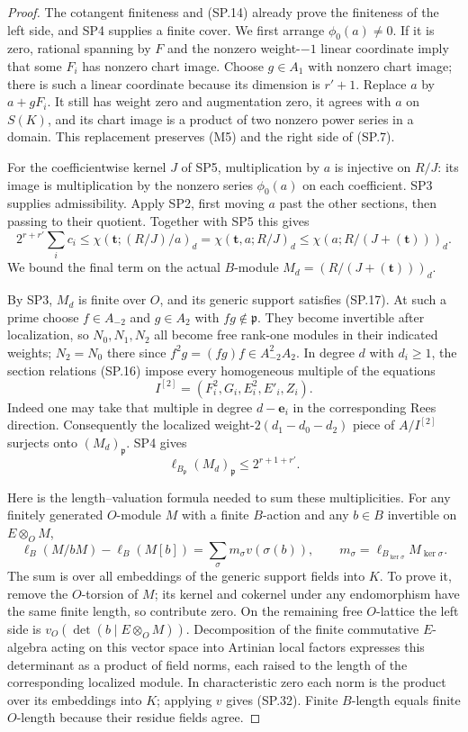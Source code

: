\begin{proof}
The cotangent finiteness and (SP.14) already prove the finiteness of
the left side, and SP4 supplies a finite cover.  We first arrange
$\phi_0(a)\ne0$.  If it is zero, rational spanning by $F$ and the
nonzero weight-$-1$ linear coordinate imply that some $F_i$ has
nonzero chart image.  Choose $g\in A_1$ with nonzero chart image;
there is such a linear coordinate because its dimension is $r'+1$.
Replace $a$ by $a+gF_i$.  It still has weight zero and augmentation
zero, it agrees with $a$ on $S(K)$, and its chart image is a product
of two nonzero power series in a domain.  This replacement preserves
(M5) and the right side of (SP.7).

For the coefficientwise kernel $J$ of SP5, multiplication by $a$
is injective on $R/J$: its image is multiplication by the nonzero
series $\phi_0(a)$ on each coefficient.  SP3 supplies admissibility.
Apply SP2, first moving $a$ past the other sections, then passing to
their quotient.  Together with SP5 this gives
\[
 2^{r+r'}\sum_i c_i
 \le \chi(\mathbf t;(R/J)/a)_d
 =\chi(\mathbf t,a;R/J)_d
 \le\chi(a;R/(J+(\mathbf t)))_d .
 \tag{SP.30}
\]
We bound the final term on the actual $B$-module
$M_d=(R/(J+(\mathbf t)))_d$.

By SP3, $M_d$ is finite over $O$, and its generic support satisfies
(SP.17).  At such a prime choose $f\in A_{-2}$ and $g\in A_2$
with $fg\notin\mathfrak p$.  They become invertible after
localization, so $N_0,N_1,N_2$ all become free rank-one modules in
their indicated weights; $N_2=N_0$ there since
$f^2g=(fg)f\in A_{-2}^2A_2$.  In degree $d$ with $d_i\ge1$, the
section relations (SP.16) impose every homogeneous multiple of the
equations
\[
                    I^{[2]}=(F_i^2,G_i,E_i^2,E'_i,Z_i).
\]
Indeed one may take that multiple in degree $d-\mathbf e_i$ in
the corresponding Rees direction.  Consequently the localized
weight-$2(d_1-d_0-d_2)$ piece of $A/I^{[2]}$ surjects onto
$(M_d)_{\mathfrak p}$.  SP4 gives
\[
                    \ell_{B_{\mathfrak p}}(M_d)_{\mathfrak p}
                         \le2^{r+1+r'}.
 \tag{SP.31}
\]

Here is the length--valuation formula needed to sum these
multiplicities.  For any finitely generated $O$-module $M$ with a finite
$B$-action and any $b\in B$ invertible on $E\otimes_OM$,
\[
 \ell_B(M/bM)-\ell_B(M[b])
       =\sum_{\sigma}m_\sigma v(\sigma(b)),\qquad
 m_\sigma=\ell_{B_{\ker\sigma}}M_{\ker\sigma}.
 \tag{SP.32}
\]
The sum is over all embeddings of the generic support fields into
$K$.  To prove it, remove the $O$-torsion of $M$; its kernel and
cokernel under any endomorphism have the same finite length, so
contribute zero.  On the remaining free $O$-lattice the left side is
$v_O(\det(b\mid E\otimes_OM))$.  Decomposition of the finite
commutative $E$-algebra acting on this vector space into Artinian
local factors expresses this determinant as a product of field
norms, each raised to the length of the corresponding localized
module.  In characteristic zero each norm is the product over its
embeddings into $K$; applying $v$ gives (SP.32).  Finite $B$-length
equals finite $O$-length because their residue fields agree.


\end{proof}

